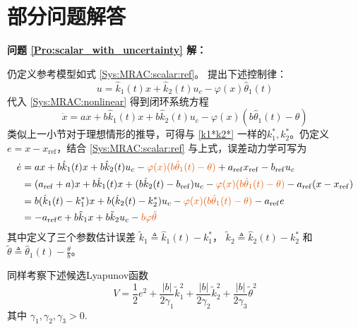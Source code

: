 \chapter{部分问题解答} \label{Problems}

\noindent\textcolor{winered}{\textbf{问题 \ref{Pro:scalar_with_uncertainty} 解：}}

仍定义参考模型如式 \eqref{Sys:MRAC:scalar:ref}。
提出下述控制律：
\[ u =  \hat{k}_1 (t) x + \hat{k}_2 (t) u_c - \varphi (x) \hat{\theta}_1 (t) \]
代入 \eqref{Sys:MRAC:nonlinear} 得到闭环系统方程
\begin{equation*}
    \dot{x} = a  x +  b \hat{k}_1 (t) x + b \hat{k}_2 (t) u_c -  \varphi  (x) (b\hat{\theta}_1 (t) - \theta) 
\end{equation*}
类似上一小节对于理想情形的推导，可得与 \eqref{k1*k2*} 一样的$k^{\ast}_1, k^{\ast}_2$。仍定义$e=x-x_{\operatorname{ref}}$，结合 \eqref{Sys:MRAC:scalar:ref} 与上式，误差动力学可写为
\begin{align}
  \dot{e} & =  a  x +  b \hat{k}_1 (t) x + b \hat{k}_2 (t) u_c -\textcolor{second}{  \varphi  (x) (b\hat{\theta}_1 (t) - \theta) }+ a_{\ensuremath{\operatorname{ref}}}
  x_{\ensuremath{\operatorname{ref}}} - b_{\ensuremath{\operatorname{ref}}}
  u_c \nonumber\\
  & = (a_{\ensuremath{\operatorname{ref}}} + a) x +  b \hat{k}_1 (t) x +
  (b \hat{k}_2 (t) - b_{\ensuremath{\operatorname{ref}}}) u_c -  \textcolor{second}{\varphi (x)
  (b\hat{\theta}_1 (t) - \theta)} - a_{\ensuremath{\operatorname{ref}}} (x-x_{\operatorname{ref}})
  \nonumber\\
  & =  b (\hat{k}_1 (t) - k^{\ast}_1) x + b (\hat{k}_2 (t) - k^{\ast}_2)
  u_c -  \textcolor{second}{\varphi (x) (b\hat{\theta}_1 (t) - \theta)} -
  a_{\ensuremath{\operatorname{ref}}} e \nonumber\\
  & =  - a_{\ensuremath{\operatorname{ref}}} e + b \tilde{k}_1 x + b
  \tilde{k}_2 u_c - \textcolor{second}{b \varphi \tilde{\theta}} \label{Pro:err:MRAC:nonlinear}
\end{align}
其中定义了三个参数估计误差 $\tilde{k}_1 \triangleq \hat{k}_1 (t) - k^{\ast}_1$， $\tilde{k}_2 \triangleq \hat{k}_2
(t) - k^{\ast}_2$ 和 \textcolor{second}{$\tilde{\theta} \triangleq\hat{\theta}_1 (t) - \frac{\theta}{b}$}。

同样考察下述候选Lyapunov函数
\begin{equation*}
  V = \frac{1}{2} e^2 + \frac{| b |}{2 \gamma_1} \tilde{k}^2_1 + \frac{| b
  |}{2 \gamma_2} \tilde{k}^2_2 + \frac{| b |}{2 \gamma_3} \tilde{\theta}^2 
\end{equation*}
其中 $\gamma_1, \gamma_2, \gamma_3 > 0$.

